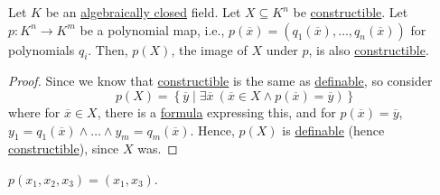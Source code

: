 \begin{theorem}\label{def:Chevalley}
	Let \(K\) be an \hyperref[def:algebraically-closed]{algebraically closed} field. Let \(X \subseteq K^n\) be \hyperref[def:constructible]{constructible}. Let \(p \colon K^n \to K^m\) be a polynomial map, i.e., \(p(\overline{x} ) = (q_1(\overline{x} ), \ldots , q_n(\overline{x} ))\) for polynomials \(q_i\). Then, \(p(X)\), the image of \(X\) under \(p\), is also \hyperref[def:constructible]{constructible}.
\end{theorem}
\begin{proof}
	Since we know that \hyperref[def:constructible]{constructible} is the same as \hyperref[def:definable]{definable}, so consider
	\[
		p(X) = \left\{ \overline{y} \mid \exists \overline{x} \ (\overline{x} \in X \land p(\overline{x} ) = \overline{y} ) \right\}
	\]
	where for \(\overline{x} \in X\), there is a \hyperref[def:formula]{formula} expressing this, and for \(p(\overline{x} ) = \overline{y} \), \(y_1 = q_1(\overline{x} ) \land \ldots \land y_m=q_m(\overline{x} )\). Hence, \(p(X)\) is \hyperref[def:definable]{definable} (hence \hyperref[def:constructible]{constructible}), since \(X\) was.
\end{proof}

\begin{eg}
	\(p(x_1, x_2, x_3) = (x_1, x_3)\).
\end{eg}

